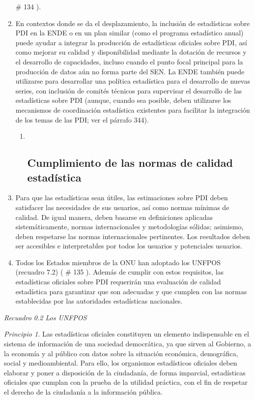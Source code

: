 \documentclass[
]{book}
\begin{document}
\begin{enumerate}
  \# 134
  ).
\item
  En contextos donde se da el desplazamiento, la inclusión de estadísticas sobre PDI en la ENDE o en un plan similar (como el programa estadístico anual) puede ayudar a integrar la producción de estadísticas oficiales sobre PDI, así como mejorar su calidad y disponibilidad mediante la dotación de recursos y el desarrollo de capacidades, incluso cuando el punto focal principal para la producción de datos aún no forma parte del SEN. La ENDE también puede utilizarse para desarrollar una política estadística para el desarrollo de nuevas series, con inclusión de comités técnicos para supervisar el desarrollo de las estadísticas sobre PDI (aunque, cuando sea posible, deben utilizarse los mecanismos de coordinación estadística existentes para facilitar la integración de los temas de las PDI; ver el párrafo 344).

  \begin{enumerate}
  \def\labelenumii{\arabic{enumii}.}
  \item ~
    \hypertarget{cumplimiento-de-las-normas-de-calidad-estaduxedstica}{%
    \subsection{Cumplimiento de las normas de calidad estadística}\label{cumplimiento-de-las-normas-de-calidad-estaduxedstica}}
  \end{enumerate}
\item
  Para que las estadísticas sean útiles, las estimaciones sobre PDI deben satisfacer las necesidades de sus usuarios, así como normas mínimas de calidad. De igual manera, deben basarse en definiciones aplicadas sistemáticamente, normas internacionales y metodologías sólidas; asimismo, deben respetarse las normas internacionales pertinentes. Los resultados deben ser accesibles e interpretables por todos los usuarios y potenciales usuarios.
\item
  Todos los Estados miembros de la ONU han adoptado los UNFPOS (recuadro 7.2) (
  \# 135
  ). Además de cumplir con estos requisitos, las estadísticas oficiales sobre PDI requerirán una evaluación de calidad estadística para garantizar que son adecuadas y que cumplen con las normas establecidas por las autoridades estadísticas nacionales.
\end{enumerate}

\emph{Recuadro 0.2 Los UNFPOS}

\emph{Principio 1.} Las estadísticas oficiales constituyen un elemento indispensable en el sistema de información de una sociedad democrática, ya que sirven al Gobierno, a la economía y al público con datos sobre la situación económica, demográfica, social y medioambiental. Para ello, los organismos estadísticos oficiales deben elaborar y poner a disposición de la ciudadanía, de forma imparcial, estadísticas oficiales que cumplan con la prueba de la utilidad práctica, con el fin de respetar el derecho de la ciudadanía a la información pública.
\end{document}
